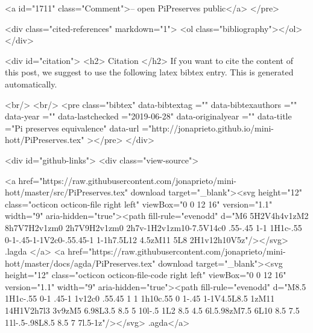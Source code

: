 <a id="1711" class="Comment">-- open PiPreserves public</a>
</pre>


  <div class="cited-references" markdown="1">
  <ol class="bibliography"></ol>
  </div>


  
  <div id="citation">
  <h2> Citation </h2>
  If you want to cite the content of this post,
  we suggest to use the following latex bibtex entry.
  This is generated automatically.

  <br/>
  <br/>
  <pre class="bibtex"
       data-bibtextag =""
       data-bibtexauthors =""
       data-year =""
       data-lastchecked ="2019-06-28"
       data-originalyear =""
       data-title ="Pi preserves equivalence"
       data-url ="http://jonaprieto.github.io/mini-hott/PiPreserves.tex"
  ></pre>
  </div>
  

  <div id="github-links">
    <div class="view-source">
      
        <a href="https://raw.githubusercontent.com/jonaprieto/mini-hott/master/src/PiPreserves.tex" download target="_blank"><svg height="12" class="octicon octicon-file right left" viewBox="0 0 12 16" version="1.1" width="9" aria-hidden="true"><path fill-rule="evenodd" d="M6 5H2V4h4v1zM2 8h7V7H2v1zm0 2h7V9H2v1zm0 2h7v-1H2v1zm10-7.5V14c0 .55-.45 1-1 1H1c-.55 0-1-.45-1-1V2c0-.55.45-1 1-1h7.5L12 4.5zM11 5L8 2H1v12h10V5z"/></svg> .lagda </a>
        <a href="https://raw.githubusercontent.com/jonaprieto/mini-hott/master/docs/agda/PiPreserves.tex" download target="_blank"><svg height="12" class="octicon octicon-file-code right left" viewBox="0 0 12 16" version="1.1" width="9" aria-hidden="true"><path fill-rule="evenodd" d="M8.5 1H1c-.55 0-1 .45-1 1v12c0 .55.45 1 1 1h10c.55 0 1-.45 1-1V4.5L8.5 1zM11 14H1V2h7l3 3v9zM5 6.98L3.5 8.5 5 10l-.5 1L2 8.5 4.5 6l.5.98zM7.5 6L10 8.5 7.5 11l-.5-.98L8.5 8.5 7 7l.5-1z"/></svg> .agda</a>
      
